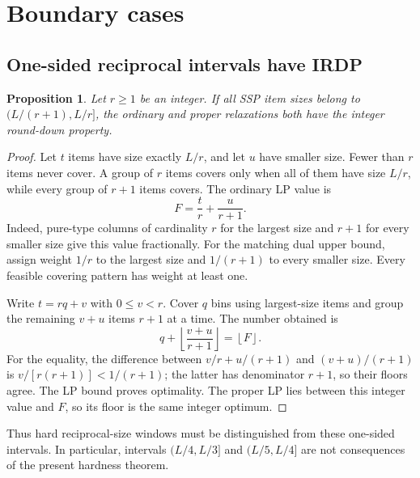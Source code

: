 \documentclass[11pt,a4paper]{article}
\newtheorem{proposition}[theorem]{Proposition}
\theoremstyle{definition}
\theoremstyle{remark}
\newcommand{\floor}[1]{\left\lfloor #1\right\rfloor}
\begin{document}
\section{Boundary cases}\label{app:boundaries}
\subsection{One-sided reciprocal intervals have IRDP}
\begin{proposition}\label{prop:one-sided}
Let $r\ge1$ be an integer. If all SSP item sizes belong to $(L/(r+1),L/r]$, the ordinary and proper relaxations both have the integer round-down property.
\end{proposition}
\begin{proof}
Let $t$ items have size exactly $L/r$, and let $u$ have smaller size. Fewer than $r$ items never cover. A group of $r$ items covers only when all of them have size $L/r$, while every group of $r+1$ items covers. The ordinary LP value is
\[
 F=\frac tr+\frac{u}{r+1}.
\]
Indeed, pure-type columns of cardinality $r$ for the largest size and $r+1$ for every smaller size give this value fractionally. For the matching dual upper bound, assign weight $1/r$ to the largest size and $1/(r+1)$ to every smaller size. Every feasible covering pattern has weight at least one.

Write $t=rq+v$ with $0\le v<r$. Cover $q$ bins using largest-size items and group the remaining $v+u$ items $r+1$ at a time. The number obtained is
\[
 q+\floor{\frac{v+u}{r+1}}=\floor{F}.
\]
For the equality, the difference between $v/r+u/(r+1)$ and $(v+u)/(r+1)$ is $v/[r(r+1)]<1/(r+1)$; the latter has denominator $r+1$, so their floors agree. The LP bound proves optimality. The proper LP lies between this integer value and $F$, so its floor is the same integer optimum.
\end{proof}
Thus hard reciprocal-size windows must be distinguished from these one-sided intervals. In particular, intervals $(L/4,L/3]$ and $(L/5,L/4]$ are not consequences of the present hardness theorem.
\end{document}
